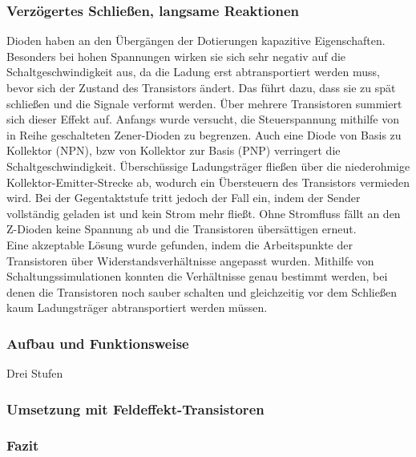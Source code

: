 \subsubsection{Verzögertes Schließen, langsame Reaktionen}
Dioden haben an den Übergängen der Dotierungen kapazitive Eigenschaften. Besonders bei hohen Spannungen wirken sie sich sehr negativ auf die Schaltgeschwindigkeit aus, da die Ladung erst abtransportiert werden muss, bevor sich der Zustand des Transistors ändert. Das führt dazu, dass sie zu spät schließen und die Signale verformt werden. Über mehrere Transistoren summiert sich dieser Effekt auf. Anfangs wurde versucht, die Steuerspannung mithilfe von in Reihe geschalteten Zener-Dioden zu begrenzen. Auch eine Diode von Basis zu Kollektor (NPN), bzw von Kollektor zur Basis (PNP) verringert die Schaltgeschwindigkeit. Überschüssige Ladungsträger fließen über die niederohmige Kollektor-Emitter-Strecke ab, wodurch ein Übersteuern des Transistors vermieden wird. Bei der Gegentaktstufe tritt jedoch der Fall ein, indem der Sender vollständig geladen ist und kein Strom mehr fließt. Ohne Stromfluss fällt an den Z-Dioden keine Spannung ab und die Transistoren übersättigen erneut.\\ %
Eine akzeptable Lösung wurde gefunden, indem die Arbeitspunkte der Transistoren über Widerstandsverhältnisse angepasst wurden. Mithilfe von Schaltungssimulationen konnten die Verhältnisse genau bestimmt werden, bei denen die Transistoren noch sauber schalten und gleichzeitig vor dem Schließen kaum Ladungsträger abtransportiert werden müssen.

\subsubsection{Aufbau und Funktionsweise}
Drei Stufen

\subsubsection{Umsetzung mit Feldeffekt-Transistoren}


\subsubsection{Fazit}




